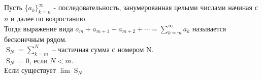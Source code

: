 \setcounter{chapter}{0}
\chapter{}
\begin{deff}
Пусть $ \{a_k \}_{k=n}^{\infty} $ - последовательность, занумерованная целыми числами начиная с $ n $ и далее по возростанию.\\
Тогда выражение вида $a_m+a_{m+1}+a_{m+2}+ \cdots = \sum_{k=m}^{\infty} a_k$ называется бесконечным рядом.\\
$ \mathbin{S}_{N} = \sum_{k=m}^{N} $ -- частичная сумма с номером N.\\
$ \mathbin{S}_{N} = 0 $, если $ N < m $.\\
Если существует $ \lim \mathbin{S}_N $
\end{deff}
